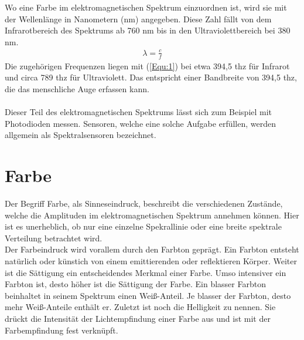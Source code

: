 \documentclass[11pt]{scrartcl}
\begin{document}
Wo eine Farbe im elektromagnetischen Spektrum einzuordnen ist, wird sie mit der Wellenlänge in Nanometern (nm) angegeben. Diese Zahl fällt von
dem Infrarotbereich des Spektrums ab 760 nm bis in den Ultraviolettbereich bei 380 nm.
\begin{align}\label{Equ:1}
    \lambda = \frac{c}{f}
\end{align}
Die zugehörigen Frequenzen liegen mit (\ref{Equ:1}) bei etwa 394,5 \ac{thz} für Infrarot und circa 789 \ac{thz} für Ultraviolett. Das
entspricht einer Bandbreite von 394,5 \ac{thz}, die das menschliche Auge erfassen kann.\\
\\
Dieser Teil des elektromagnetischen Spektrums lässt sich zum Beispiel mit Photodioden messen. Sensoren, welche eine solche Aufgabe erfüllen,
werden allgemein als Spektralsensoren bezeichnet.
\clearpage

\section{Farbe}
Der Begriff Farbe, als Sinneseindruck, beschreibt die verschiedenen Zustände, welche die Amplituden im elektromagnetischen Spektrum annehmen können. Hier ist es
unerheblich, ob nur eine einzelne Spekrallinie oder eine breite spektrale Verteilung betrachtet wird.\\
Der Farbeindruck wird vorallem durch den Farbton geprägt. Ein Farbton entsteht natürlich oder künstich von einem emittierenden oder reflektieren Körper.
Weiter ist die Sättigung ein entscheidendes Merkmal einer Farbe. Umso intensiver ein Farbton ist, desto höher ist die Sättigung der Farbe. Ein blasser
Farbton beinhaltet in seinem Spektrum einen Weiß-Anteil. Je blasser der Farbton, desto mehr Weiß-Anteile enthält er. Zuletzt ist noch die Helligkeit zu
nennen. Sie drückt die Intensität der Lichtempfindung einer Farbe aus und ist mit der Farbempfindung fest verknüpft.
\end{document}
